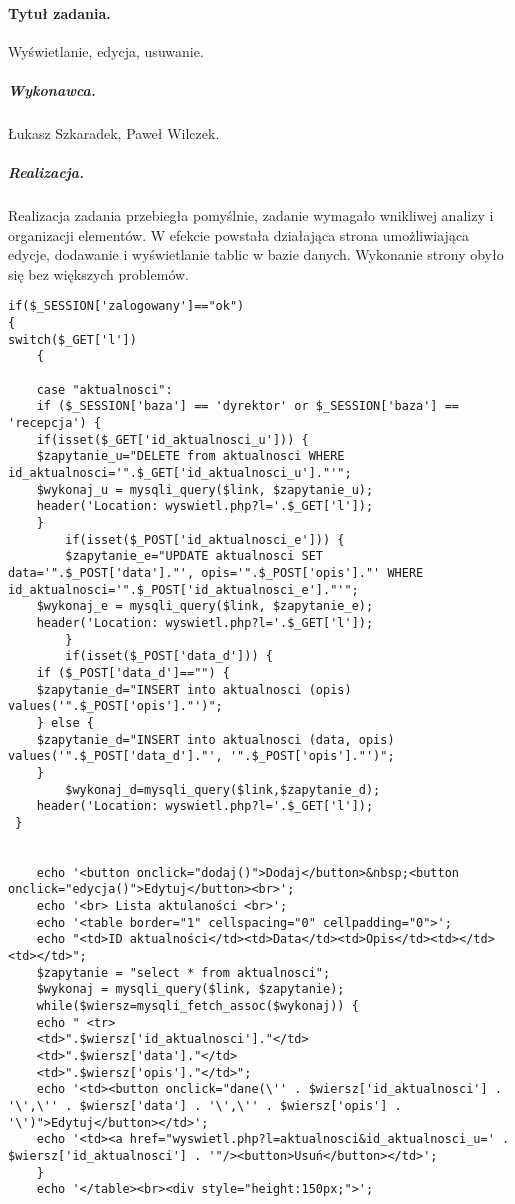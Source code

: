\documentclass[a4paper]{article} \usepackage{polski} \usepackage[cp1250]{inputenc} \usepackage{url}
\begin{document}
\paragraph{Tytuł zadania.}Wyświetlanie, edycja, usuwanie.  \subparagraph{Wykonawca.} Łukasz Szkaradek, Paweł Wilczek. \subparagraph{Realizacja.}Realizacja zadania przebiegła pomyślnie, zadanie wymagało wnikliwej analizy i organizacji elementów. W efekcie powstała działająca strona umożliwiająca edycje, dodawanie i wyświetlanie tablic w bazie danych. Wykonanie strony obyło się bez większych problemów. 
\begin{verbatim} 
if($_SESSION['zalogowany']=="ok")
{
switch($_GET['l'])
	{
	    
	case "aktualnosci":
	if ($_SESSION['baza'] == 'dyrektor' or $_SESSION['baza'] == 'recepcja') {
	if(isset($_GET['id_aktualnosci_u'])) {
	$zapytanie_u="DELETE from aktualnosci WHERE id_aktualnosci='".$_GET['id_aktualnosci_u']."'";
	$wykonaj_u = mysqli_query($link, $zapytanie_u);
	header('Location: wyswietl.php?l='.$_GET['l']);
	}
    	if(isset($_POST['id_aktualnosci_e'])) { 
    	$zapytanie_e="UPDATE aktualnosci SET data='".$_POST['data']."', opis='".$_POST['opis']."' WHERE id_aktualnosci='".$_POST['id_aktualnosci_e']."'";
	$wykonaj_e = mysqli_query($link, $zapytanie_e);
	header('Location: wyswietl.php?l='.$_GET['l']);
    	}
    	if(isset($_POST['data_d'])) { 
	if ($_POST['data_d']=="") {
	$zapytanie_d="INSERT into aktualnosci (opis) values('".$_POST['opis']."')";
	} else {
	$zapytanie_d="INSERT into aktualnosci (data, opis) values('".$_POST['data_d']."', '".$_POST['opis']."')";
	}
    	$wykonaj_d=mysqli_query($link,$zapytanie_d);
   	header('Location: wyswietl.php?l='.$_GET['l']);
 }
    
    
	echo '<button onclick="dodaj()">Dodaj</button>&nbsp;<button onclick="edycja()">Edytuj</button><br>';
	echo '<br> Lista aktulaności <br>';
	echo '<table border="1" cellspacing="0" cellpadding="0">';
	echo "<td>ID aktualności</td><td>Data</td><td>Opis</td><td></td><td></td>";
	$zapytanie = "select * from aktualnosci";
	$wykonaj = mysqli_query($link, $zapytanie);
	while($wiersz=mysqli_fetch_assoc($wykonaj)) {
	echo " <tr>
	<td>".$wiersz['id_aktualnosci']."</td>
	<td>".$wiersz['data']."</td>
	<td>".$wiersz['opis']."</td>";
	echo '<td><button onclick="dane(\'' . $wiersz['id_aktualnosci'] . '\',\'' . $wiersz['data'] . '\',\'' . $wiersz['opis'] . '\')">Edytuj</button></td>';
	echo '<td><a href="wyswietl.php?l=aktualnosci&id_aktualnosci_u=' . $wiersz['id_aktualnosci'] . '"/><button>Usuń</button></td>';
	}
	echo '</table><br><div style="height:150px;">';
	

\end{verbatim}
\end{document}
